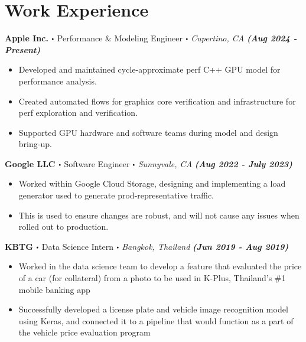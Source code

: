\documentclass[10pt]{article}
\newcommand\sbullet[1][.5]{\mathbin{\vcenter{\hbox{\scalebox{#1}{$\bullet$}}}}}
\begin{document}
  \vspace*{-1.0cm}
  \section*{\Large \textcolor{lighterB} {Work Experience}}

  \textbf{\large Apple Inc. $\sbullet$} {\large Performance \& Modeling Engineer $\sbullet$ \textit{Cupertino, CA}} {\hfill \textit{\textbf{(Aug 2024 - Present)}}}

  \vspace*{-0.2cm}
  \begin{itemize}
    \itemsep-0.4em
    \item \textcolor{lighterG}{Developed and maintained cycle-approximate perf C++ GPU model for performance analysis.}
    \item \textcolor{lighterG}{Created automated flows for graphics core verification and infrastructure for perf exploration and verification.}
    \item \textcolor{lighterG}{Supported GPU hardware and software teams during model and design bring-up.}
  \end{itemize}


\textbf{\large Google LLC $\sbullet$} {\large Software Engineer $\sbullet$ \textit{Sunnyvale, CA}} {\hfill \textit{\textbf{(Aug 2022 - July 2023)}}}

  \vspace*{-0.2cm}
  \begin{itemize}
    \itemsep-0.4em
\item \textcolor{lighterG}{Worked within Google Cloud Storage, designing and implementing a load generator used to generate prod-representative traffic.}
    \item \textcolor{lighterG}{This is used to ensure changes are robust, and will not cause any issues when rolled out to production.}
  \end{itemize}

\textbf{\large KBTG $\sbullet$} {\large Data Science Intern $\sbullet$ \textit{Bangkok, Thailand}} {\hfill \textit{\textbf{(Jun 2019 - Aug 2019)}}}

  \vspace*{-0.2cm}
  \begin{itemize}
    \itemsep-0.4em
    \item \textcolor{lighterG}{Worked in the data science team to develop a feature that evaluated the price of a car (for collateral) from a photo to be used in K-Plus, Thailand's \#1 mobile banking app}
    \item \textcolor{lighterG}{Successfully developed a license plate and vehicle image recognition model using Keras, and connected it to a pipeline that would function as a part of the vehicle price evaluation program}
  \end{itemize}
\end{document}
